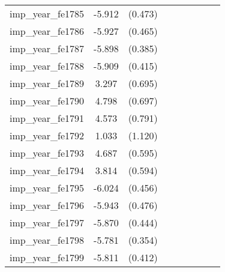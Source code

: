 {\begin{tabular}{l*{4}{cc}}
imp\_year\_fe1785&   -5.912\sym{***}&  (0.473)&                  &         &                  &         &                  &         \\
imp\_year\_fe1786&   -5.927\sym{***}&  (0.465)&                  &         &                  &         &                  &         \\
imp\_year\_fe1787&   -5.898\sym{***}&  (0.385)&                  &         &                  &         &                  &         \\
imp\_year\_fe1788&   -5.909\sym{***}&  (0.415)&                  &         &                  &         &                  &         \\
imp\_year\_fe1789&    3.297\sym{***}&  (0.695)&                  &         &                  &         &                  &         \\
imp\_year\_fe1790&    4.798\sym{***}&  (0.697)&                  &         &                  &         &                  &         \\
imp\_year\_fe1791&    4.573\sym{***}&  (0.791)&                  &         &                  &         &                  &         \\
imp\_year\_fe1792&    1.033         &  (1.120)&                  &         &                  &         &                  &         \\
imp\_year\_fe1793&    4.687\sym{***}&  (0.595)&                  &         &                  &         &                  &         \\
imp\_year\_fe1794&    3.814\sym{***}&  (0.594)&                  &         &                  &         &                  &         \\
imp\_year\_fe1795&   -6.024\sym{***}&  (0.456)&                  &         &                  &         &                  &         \\
imp\_year\_fe1796&   -5.943\sym{***}&  (0.476)&                  &         &                  &         &                  &         \\
imp\_year\_fe1797&   -5.870\sym{***}&  (0.444)&                  &         &                  &         &                  &         \\
imp\_year\_fe1798&   -5.781\sym{***}&  (0.354)&                  &         &                  &         &                  &         \\
imp\_year\_fe1799&   -5.811\sym{***}&  (0.412)&                  &         &                  &         &                  &         \\

\end{tabular}}
